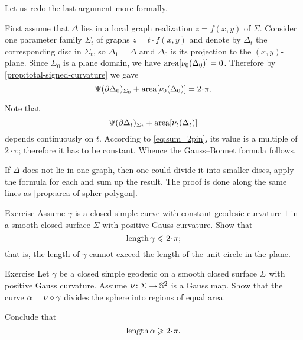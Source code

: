 Let us redo the last argument more formally.

First assume that $\Delta$ lies in a local graph realization $z=f(x,y)$ of $\Sigma$.
Consider one parameter family $\Sigma_t$ of graphs $z=t\cdot f(x,y)$ and denote by $\Delta_t$ the corresponding disc in $\Sigma_t$, so $\Delta_1=\Delta$ amd $\Delta_0$ is its projection to the $(x,y)$-plane.
Since $\Sigma_0$ is a plane domain, we have $\mathop{\rm area}\nolimits[\nu_0(\Delta_0)]=0$.
Therefore by \ref{prop:total-signed-curvature} we gave 
\[\tgc{\partial\Delta_0}_{\Sigma_0}+\area[\Norm_0(\Delta_0)]=2\cdot \pi.\]

Note that 
\[\Psi({\partial\Delta_t})_{\Sigma_t}+\mathop{\rm area}\nolimits[\nu_t(\Delta_t)]\]
depends continuously on $t$.
According to \ref{eq:sum=2pin}, its value is a multiple of $2\cdot\pi$;
therefore it has to be constant.
Whence the Gauss--Bonnet formula follows.

If $\Delta$ does not lie in one graph, then one could divide it into smaller discs, apply the formula for each and sum up the result.
The proof is done along the same lines as \ref{prop:area-of-spher-polygon}.
\qeds



\begin{thm}{Exercise}\label{ex:1=geodesic-curvature}
 Assume $\gamma$ is a closed simple curve with constant geodesic curvature $1$ in a smooth closed surface $\Sigma$ with positive Gauss curvature.
 Show that 
 \[\length\gamma\le 2\cdot\pi;\]
that is, the length of $\gamma$ cannot exceed the length of the unit circle in the plane.  
\end{thm}


\begin{thm}{Exercise}\label{ex:geodesic-half}
Let $\gamma$ be a closed simple geodesic on a smooth closed surface $\Sigma$ with positive Gauss curvature.
Assume $\nu\colon\Sigma\to\mathbb{S}^2$ is a Gauss map.
Show that the curve $\alpha=\nu\circ\gamma$ divides the sphere into regions of equal area.

Conclude that
\[\length \alpha\ge 2\cdot\pi.\]
\end{thm}


